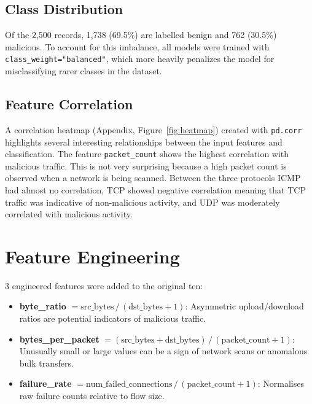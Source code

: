 \documentclass[11pt]{article}
\begin{document}
\subsection{Class Distribution}

Of the 2,500 records, 1,738 (69.5\%) are labelled benign and 762 (30.5\%)
malicious. To account for this imbalance, all models were trained with \texttt{class\_weight="balanced"}, which more heavily penalizes the model for misclassifying rarer classes in the dataset.

\subsection{Feature Correlation}

A correlation heatmap (Appendix, Figure~\ref{fig:heatmap}) created with \texttt{pd.corr} highlights several interesting relationships between the input features and classification. The feature \texttt{packet\_count} shows the highest correlation with malicious traffic. This is not very surprising because a high packet count is observed when a network is being scanned. Between the three protocols ICMP had almost no correlation, TCP showed negative correlation meaning that TCP traffic was indicative of non-malicious activity, and UDP was moderately correlated with malicious activity.
\section{Feature Engineering}
\label{sec:features}

3 engineered features were added to the original ten:

\begin{itemize}
    \item \textbf{byte\_ratio} $= \text{src\_bytes}\,/\,(\text{dst\_bytes}+1)$:
          Asymmetric upload/download ratios are potential indicators of malicious traffic.
    \item \textbf{bytes\_per\_packet} $= (\text{src\_bytes}+\text{dst\_bytes})\,/\,(\text{packet\_count}+1)$:
          Unusually small or large values can be a sign of network scans or anomalous bulk transfers.
    \item \textbf{failure\_rate} $= \text{num\_failed\_connections}\,/\,(\text{packet\_count}+1)$:
          Normalises raw failure counts relative to flow size.
\end{itemize}
\end{document}
